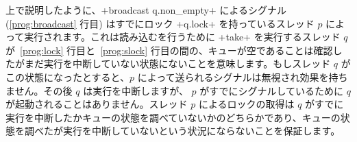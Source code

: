 上で説明したように、\ml+broadcast q.non_empty+ によるシグナル (\ref{prog:broadcast} 行目) はすでにロック \ml+q.lock+ を持っているスレッド $p$ によって実行されます。これは読み込むを行うために \ml+take+ を実行するスレッド $q$ が~\ref{prog:lock} 行目と~\ref{prog:slock} 行目の間の、キューが空であることは確認したがまだ実行を中断していない状態にないことを意味します。もしスレッド $q$ がこの状態になったとすると、$p$ によって送られるシグナルは無視され効果を持ちません。その後 $q$ は実行を中断しますが、 $p$ がすでにシグナルしているために $q$ が起動されることはありません。スレッド $p$ によるロックの取得は $q$ がすでに実行を中断したかキューの状態を調べていないかのどちらかであり、キューの状態を調べたが実行を中断していないという状況にならないことを保証します。

